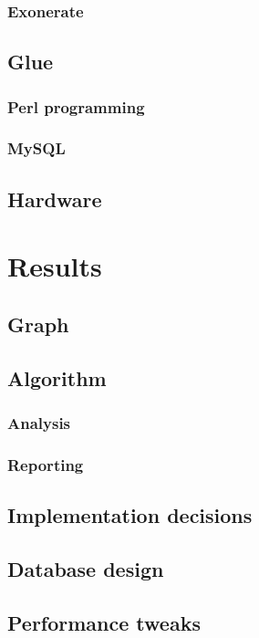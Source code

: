 \documentclass[a4paper,13pt]{scrreprt}
\begin{document}
		\subsection{Exonerate}
			
	\section{Glue}
		\subsection{Perl programming}
			
		\subsection{MySQL}
			
	\section{Hardware}
		

\chapter{Results}
	\section{Graph}
		
	\section{Algorithm}
		\subsection{Analysis}
			
		\subsection{Reporting}
			
	\section{Implementation decisions}
		
	\section{Database design}
		
	\section{Performance tweaks}
\end{document}
